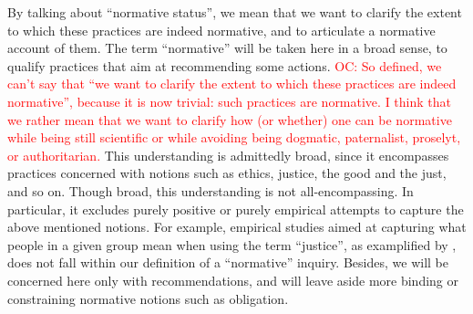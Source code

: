 \documentclass[preprint, french, english, 11pt, authoryear]{elsarticle}%
\newcommand{\commentOC}[1]{\textcolor{red}{OC: #1}}
\begin{document}
By talking about “normative status”, we mean that we want to clarify the extent to which these practices are indeed normative, and to articulate a normative account of them. 
The term “normative” will be taken here in a broad sense, to qualify practices that aim at recommending some actions. 
\commentOC{So defined, we can’t say that “we want to clarify the extent to which these practices are indeed normative”, because it is now trivial: such practices are normative. I think that we rather mean that we want to clarify how (or whether) one can be normative while being still scientific or while avoiding being dogmatic, paternalist, proselyt, or authoritarian.}
This understanding is admittedly broad, since it encompasses practices concerned with notions such as ethics, justice, the good and the just, and so on. 
Though broad, this understanding is not all-encompassing. In particular, it excludes purely positive or purely empirical attempts to capture the above mentioned notions. For example, empirical studies aimed at capturing what people in a given group mean when using the term “justice”, as examplified by \citet{gaertner_empirical_2012}, does not fall within our definition of a “normative” inquiry. Besides, we will be concerned here only with recommendations, and will leave aside more binding or constraining normative notions such as obligation.
\end{document}
